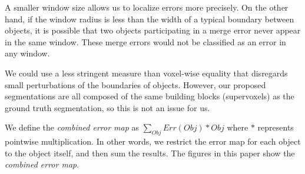 \documentclass{article}
\begin{document}
A smaller window size allows us to localize errors more precisely. On the other hand, if the window radius is less than the width of a typical boundary between objects, it is possible that two objects participating in a merge error never appear in the same window. These merge errors would not be classified as an error in any window.

We could use a less stringent measure than voxel-wise equality that disregards small perturbations of the boundaries of objects. However, our proposed segmentations are all composed of the same building blocks (supervoxels) as the ground truth segmentation, so this is not an issue for us.

We define the \textit{combined error map} as $\sum_{Obj} Err(Obj) * Obj$ where $*$ represents pointwise multiplication. In other words, we restrict the error map for each object to the object itself, and then sum the results. The figures in this paper show the \textit{combined error map}.
\end{document}
